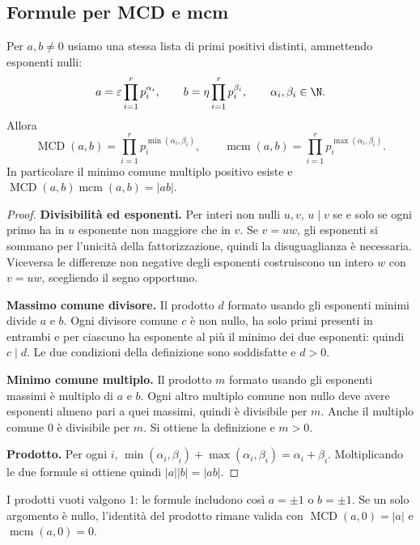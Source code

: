 \subsection{Formule per MCD e mcm}
\begin{proposizione}\label{prop:mcd-mcm}
Per $a,b\ne0$ usiamo una stessa lista di primi positivi distinti, ammettendo esponenti nulli:
\[
a=\varepsilon\prod_{i=1}^r p_i^{\alpha_i},\qquad
b=\eta\prod_{i=1}^r p_i^{\beta_i},\qquad \alpha_i,\beta_i\in\N.
\]
Allora
\[
\operatorname{MCD}(a,b)=\prod_{i=1}^r p_i^{\min(\alpha_i,\beta_i)},\qquad
\operatorname{mcm}(a,b)=\prod_{i=1}^r p_i^{\max(\alpha_i,\beta_i)}.
\]
In particolare il minimo comune multiplo positivo esiste e $\operatorname{MCD}(a,b)\operatorname{mcm}(a,b)=|ab|$.
\end{proposizione}
\begin{proof}
\textbf{Divisibilità ed esponenti.} Per interi non nulli $u,v$, $u\mid v$ se e solo se ogni primo ha in $u$ esponente non maggiore che in $v$. Se $v=uw$, gli esponenti si sommano per l'unicità della fattorizzazione, quindi la disuguaglianza è necessaria. Viceversa le differenze non negative degli esponenti costruiscono un intero $w$ con $v=uw$, scegliendo il segno opportuno.

\textbf{Massimo comune divisore.} Il prodotto $d$ formato usando gli esponenti minimi divide $a$ e $b$. Ogni divisore comune $c$ è non nullo, ha solo primi presenti in entrambi e per ciascuno ha esponente al più il minimo dei due esponenti: quindi $c\mid d$. Le due condizioni della definizione sono soddisfatte e $d>0$.

\textbf{Minimo comune multiplo.} Il prodotto $m$ formato usando gli esponenti massimi è multiplo di $a$ e $b$. Ogni altro multiplo comune non nullo deve avere esponenti almeno pari a quei massimi, quindi è divisibile per $m$. Anche il multiplo comune $0$ è divisibile per $m$. Si ottiene la definizione e $m>0$.

\textbf{Prodotto.} Per ogni $i$, $\min(\alpha_i,\beta_i)+\max(\alpha_i,\beta_i)=\alpha_i+\beta_i$. Moltiplicando le due formule si ottiene quindi $|a||b|=|ab|$.
\end{proof}

I prodotti vuoti valgono $1$: le formule includono così $a=\pm1$ o $b=\pm1$. Se un solo argomento è nullo, l'identità del prodotto rimane valida con $\operatorname{MCD}(a,0)=|a|$ e $\operatorname{mcm}(a,0)=0$.

